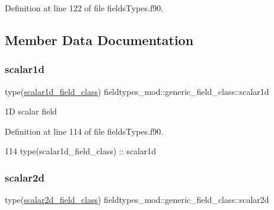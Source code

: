 Definition at line 122 of file fields\+Types.\+f90.



\subsection{Member Data Documentation}
\mbox{\label{structfieldtypes__mod_1_1generic__field__class_ab28f23e646f7cfe4a42d6dc47a896bf9}} 
\subsubsection{\texorpdfstring{scalar1d}{scalar1d}}
{\footnotesize\ttfamily type(\mbox{\hyperlink{structfieldtypes__mod_1_1scalar1d__field__class}{scalar1d\+\_\+field\+\_\+class}}) fieldtypes\+\_\+mod\+::generic\+\_\+field\+\_\+class\+::scalar1d\hspace{0.3cm}{\ttfamily [private]}}



1D scalar field 



Definition at line 114 of file fields\+Types.\+f90.


\begin{DoxyCode}
114         \textcolor{keywordtype}{type}(scalar1d\_field\_class) :: scalar1d
\end{DoxyCode}
\mbox{\label{structfieldtypes__mod_1_1generic__field__class_ad4d960a63ab944d31c3a5c7538418d59}} 
\subsubsection{\texorpdfstring{scalar2d}{scalar2d}}
{\footnotesize\ttfamily type(\mbox{\hyperlink{structfieldtypes__mod_1_1scalar2d__field__class}{scalar2d\+\_\+field\+\_\+class}}) fieldtypes\+\_\+mod\+::generic\+\_\+field\+\_\+class\+::scalar2d\hspace{0.3cm}{\ttfamily [private]}}



